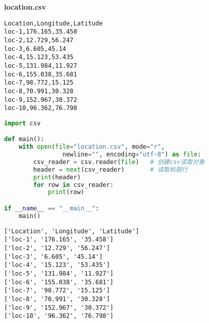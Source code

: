 \begin{tcolorbox}
	\textbf{location.csv}
	\begin{verbatim}
Location,Longitude,Latitude
loc-1,176.165,35.458
loc-2,12.729,56.247
loc-3,6.605,45.14
loc-4,15.123,53.435
loc-5,131.984,11.927
loc-6,155.038,35.681
loc-7,98.772,15.125
loc-8,70.991,30.328
loc-9,152.967,30.372
loc-10,96.362,76.798
\end{verbatim}
\end{tcolorbox}

\vspace{0.5cm}


\begin{lstlisting}[language=Python]
import csv

def main():
    with open(file="location.csv", mode="r", 
                newline="", encoding="utf-8") as file:
        csv_reader = csv.reader(file)   # 创建csv读取对象
        header = next(csv_reader)       # 读取标题行
        print(header)
        for row in csv_reader:
            print(row)

if __name__ == "__main__":
    main()
\end{lstlisting}

\begin{tcolorbox}
	\begin{verbatim}
['Location', 'Longitude', 'Latitude']
['loc-1', '176.165', '35.458']
['loc-2', '12.729', '56.247']
['loc-3', '6.605', '45.14']
['loc-4', '15.123', '53.435']
['loc-5', '131.984', '11.927']
['loc-6', '155.038', '35.681']
['loc-7', '98.772', '15.125']
['loc-8', '70.991', '30.328']
['loc-9', '152.967', '30.372']
['loc-10', '96.362', '76.798']
\end{verbatim}
\end{tcolorbox}

\newpage